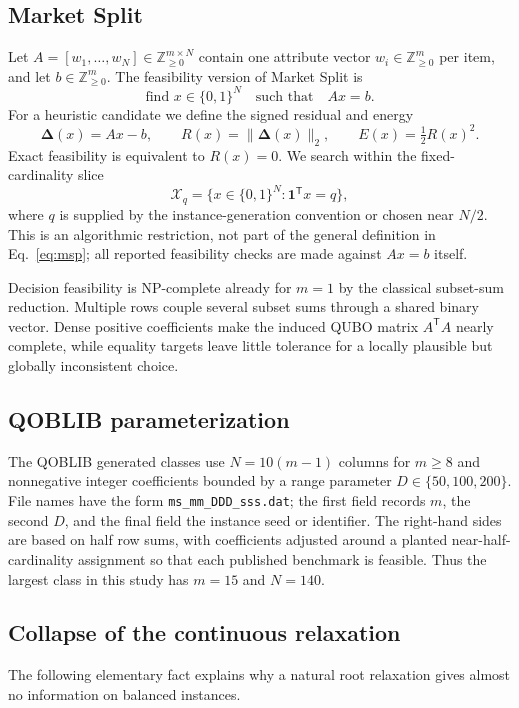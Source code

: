 \documentclass[11pt]{article}
\newcommand{\Z}{\mathbb{Z}}
\newcommand{\B}{\{0,1\}}
\newcommand{\res}{\boldsymbol{\Delta}}
\begin{document}
\subsection{Market Split}
Let $A=[w_1,\ldots,w_N]\in\Z_{\geq0}^{m\times N}$ contain one attribute vector $w_i\in\Z_{\geq0}^{m}$ per item, and let $b\in\Z_{\geq0}^{m}$. The feasibility version of Market Split is
\begin{equation}
  \text{find }x\in\B^N\quad\text{such that}\quad Ax=b.
  \label{eq:msp}
\end{equation}
For a heuristic candidate we define the signed residual and energy
\begin{equation}
  \res(x)=Ax-b,\qquad R(x)=\|\res(x)\|_2,
  \qquad E(x)=\tfrac12R(x)^2.
  \label{eq:residual}
\end{equation}
Exact feasibility is equivalent to $R(x)=0$. We search within the fixed-cardinality slice
\begin{equation}
  \mathcal{X}_q=\{x\in\B^N:\mathbf{1}^{\mathsf T}x=q\},
  \label{eq:cardinality}
\end{equation}
where $q$ is supplied by the instance-generation convention or chosen near $N/2$. This is an algorithmic restriction, not part of the general definition in Eq.~\eqref{eq:msp}; all reported feasibility checks are made against $Ax=b$ itself.

Decision feasibility is NP-complete already for $m=1$ by the classical subset-sum reduction. Multiple rows couple several subset sums through a shared binary vector. Dense positive coefficients make the induced QUBO matrix $A^{\mathsf T}A$ nearly complete, while equality targets leave little tolerance for a locally plausible but globally inconsistent choice.

\subsection{QOBLIB parameterization}
The QOBLIB generated classes use $N=10(m-1)$ columns for $m\geq8$ and nonnegative integer coefficients bounded by a range parameter $D\in\{50,100,200\}$. File names have the form \texttt{ms\_mm\_DDD\_sss.dat}; the first field records $m$, the second $D$, and the final field the instance seed or identifier. The right-hand sides are based on half row sums, with coefficients adjusted around a planted near-half-cardinality assignment so that each published benchmark is feasible. Thus the largest class in this study has $m=15$ and $N=140$.

\subsection{Collapse of the continuous relaxation}
The following elementary fact explains why a natural root relaxation gives almost no information on balanced instances.
\end{document}
